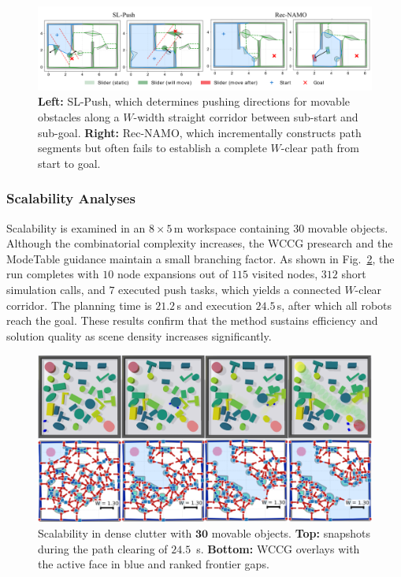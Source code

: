 \begin{figure}[t!]
  \centering
  \includegraphics[width=0.95\columnwidth]{figures/Rec_NAMO.pdf}
  \vspace{-0.15in}
  \caption{\textbf{Left:} SL-Push, which determines pushing directions for movable obstacles along a $W$-width straight corridor between sub-start and sub-goal. \textbf{Right:} Rec-NAMO, which incrementally constructs path segments but often fails to establish a complete $W$-clear path from start to goal.}
  \vspace{-0.2in}
  \label{fig:baseline}
\end{figure}


\subsubsection{Scalability Analyses}\label{subsec:scalability}
Scalability is examined in an $8{\times}5$\,m workspace containing $30$ movable objects. Although
the combinatorial complexity increases, the WCCG presearch and the ModeTable guidance maintain a
small branching factor. As shown in Fig.~\ref{fig:scalability}, the run completes with $10$ node
expansions out of $115$ visited nodes, $312$ short simulation calls, and $7$ executed push tasks,
which yields a connected $W$-clear corridor. The planning time is $21.2$\,s and execution
$24.5$\,s, after which all robots reach the goal. These results confirm that the method sustains
efficiency and solution quality as scene density increases significantly.
\begin{figure}[t!]
  \centering
  \includegraphics[width=0.95\linewidth]{figures/scalability.png}
  \vspace{-0.1in}
 \caption{Scalability in dense clutter with $\boldsymbol{30}$ movable objects.
\textbf{Top:} snapshots during the path clearing of $24.5$~s.
\textbf{Bottom:} WCCG overlays with the active face in blue and ranked frontier gaps.}
\label{fig:scalability}
\vspace{-0.2in}
\end{figure}


